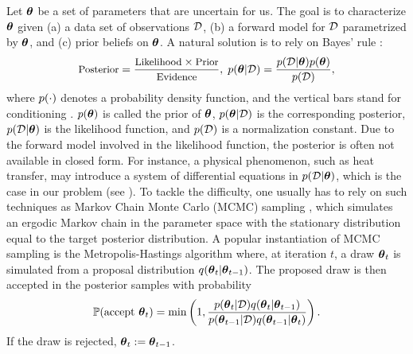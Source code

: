 Let ${\boldsymbol\theta}$ be a set of parameters that are uncertain for us. The goal is to characterize ${\boldsymbol\theta}$ given (a) a data set of observations $\mathcal{D}$, (b) a forward model for $\mathcal{D}$ parametrized by ${\boldsymbol\theta}$, and (c) prior beliefs on ${\boldsymbol\theta}$. A natural solution is to rely on Bayes' rule \cite{gelman2004}:
\[
  \text{\small Posterior} = \frac{\text{\small Likelihood} \times \text{\small Prior}}{\text{\small Evidence}}, \; \f{\vparam | \Data} = \frac{\f{\Data | \vparam} \f{\vparam}}{\f{\Data}},
\]
where $\f{\cdot}$ denotes a probability density function, and the vertical bars stand for conditioning \cite{durrett2010}. $\f{\vparam}$ is called the prior of ${\boldsymbol\theta}$, $\f{\vparam | \Data}$ is the corresponding posterior, $\f{\Data | \vparam}$ is the likelihood function, and $\f{\Data}$ is a normalization constant.
Due to the forward model involved in the likelihood function, the posterior is often not available in closed form.
For instance, a physical phenomenon, such as heat transfer, may introduce a system of differential equations in $\f{\Data | \vparam}$, which is the case in our problem (see ).
To tackle the difficulty, one usually has to rely on such techniques as Markov Chain Monte Carlo (MCMC) sampling \cite{gelman2004}, which simulates an ergodic Markov chain in the parameter space with the stationary distribution equal to the target posterior distribution.
A popular instantiation of MCMC sampling is the Metropolis-Hastings algorithm where, at iteration $t$, a draw ${\boldsymbol\theta}_t$ is simulated from a proposal distribution $q({\boldsymbol\theta}_t | {\boldsymbol\theta}_{t - 1})$. The proposed draw is then accepted in the posterior samples with probability
\[
  \probabilityMeasure(\text{accept } \vparam_t) = \min\left(1, \frac{\f{\vparam_t |  \Data} q(\vparam_t | \vparam_{t - 1})}{\f{\vparam_{t - 1} | \Data} q(\vparam_{t - 1} | \vparam_t)} \right).
\]
If the draw is rejected, ${\boldsymbol\theta}_t := {\boldsymbol\theta}_{t - 1}$.
